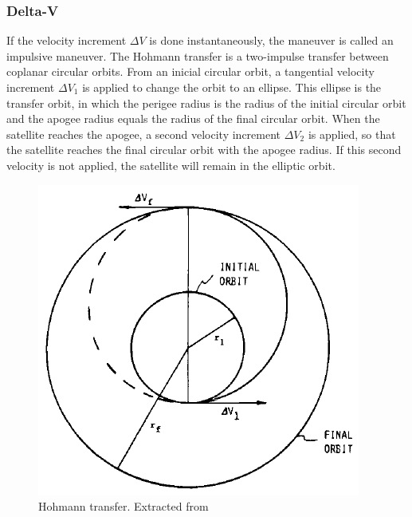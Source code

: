 \subsubsection{Delta-V}
If the velocity increment $\Delta V$ is done instantaneously, the maneuver is called an impulsive maneuver. The Hohmann transfer is a two-impulse transfer between coplanar circular orbits. From an inicial circular orbit, a tangential velocity increment $\Delta V_{1}$ is applied to change the orbit to an ellipse. This ellipse is the transfer orbit, in which the perigee radius is the radius of the initial circular orbit and the apogee radius equals the radius of the final circular orbit. When the satellite reaches the apogee, a second velocity increment $\Delta V_{2}$ is applied, so that the satellite reaches the final circular orbit with the apogee radius. If this second velocity is not applied, the satellite will remain in the elliptic orbit.
\begin{figure}
\centerline{\includegraphics[scale=0.7]{ThrustersDrag/Hohmann.png}}
\caption{Hohmann transfer. Extracted from \cite{Chobotov2002}}
\end{figure}

